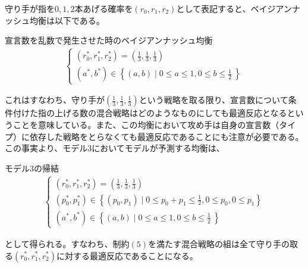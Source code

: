\documentclass{jsarticle}
\begin{document}
守り手が指を$0,1,2$本あげる確率を$(r_0, r_1, r_2)$として表記すると、ベイジアンナッシュ均衡は以下である。
\begin{itembox}[l]{宣言数を乱数で発生させた時のベイジアンナッシュ均衡}
\begin{align}
\begin{cases}(r_0^*, r_1^*, r_2^*) = (\frac{1}{3}, \frac{1}{3}, \frac{1}{3}) \\[7pt]
(a^*, b^*) \in \left\{ (a,b) \mid 0 \leq a \leq 1, 0 \leq b \leq \frac{1}{2}\ \right\}
\end{cases}
\end{align}
\end{itembox}
これはすなわち、守り手が$(\frac{1}{3}, \frac{1}{3}, \frac{1}{3})$という戦略を取る限り、宣言数について条件付けた指の上げる数の混合戦略はどのようなものにしても最適反応となるということを意味している。また、この均衡において攻め手は自身の宣言数（タイプ）に依存した戦略をとらなくても最適反応であることにも注意が必要である。この事実より、モデル3においてモデルが予測する均衡は、
\begin{itembox}[l]{モデル3の帰結}
\begin{align}
\begin{cases}(r_0^*, r_1^*, r_2^*) = (\frac{1}{3}, \frac{1}{3}, \frac{1}{3}) \\[7pt]
(p_0^*, p_1^*) \in \left\{ (p_0, p_1) \mid 0 \leq p_0 + p_1 \leq \frac{1}{2}, 0 \leq p_0, 0 \leq p_1 \right\}\\[7pt]
(a^*, b^*) \in \left\{ (a,b) \mid 0 \leq a \leq 1, 0 \leq b \leq \frac{1}{2}\ \right\}
\end{cases}
\end{align}
\end{itembox}
として得られる。すなわち、制約$(5)$を満たす混合戦略の組は全て守り手の取る$(r_0^*, r_1^*, r_2^*)$に対する最適反応であることになる。
\end{document}
